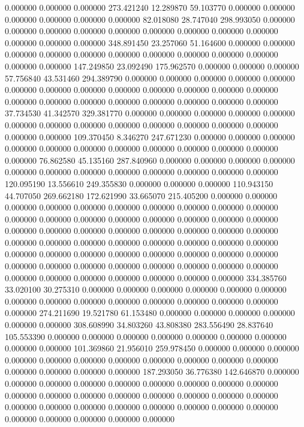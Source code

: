 0.000000 0.000000 0.000000
273.421240 12.289870 59.103770
0.000000 0.000000 0.000000
0.000000 0.000000 0.000000
82.018080 28.747040 298.993050
0.000000 0.000000 0.000000
0.000000 0.000000 0.000000
0.000000 0.000000 0.000000
0.000000 0.000000 0.000000
348.891450 23.257060 51.164600
0.000000 0.000000 0.000000
0.000000 0.000000 0.000000
0.000000 0.000000 0.000000
0.000000 0.000000 0.000000
147.249850 23.092490 175.962570
0.000000 0.000000 0.000000
57.756840 43.531460 294.389790
0.000000 0.000000 0.000000
0.000000 0.000000 0.000000
0.000000 0.000000 0.000000
0.000000 0.000000 0.000000
0.000000 0.000000 0.000000
0.000000 0.000000 0.000000
0.000000 0.000000 0.000000
37.734530 41.342570 329.381770
0.000000 0.000000 0.000000
0.000000 0.000000 0.000000
0.000000 0.000000 0.000000
0.000000 0.000000 0.000000
0.000000 0.000000 0.000000
109.370450 8.346270 247.671230
0.000000 0.000000 0.000000
0.000000 0.000000 0.000000
0.000000 0.000000 0.000000
0.000000 0.000000 0.000000
76.862580 45.135160 287.840960
0.000000 0.000000 0.000000
0.000000 0.000000 0.000000
0.000000 0.000000 0.000000
0.000000 0.000000 0.000000
120.095190 13.556610 249.355830
0.000000 0.000000 0.000000
110.943150 44.707050 269.662180
172.621990 33.665070 215.405200
0.000000 0.000000 0.000000
0.000000 0.000000 0.000000
0.000000 0.000000 0.000000
0.000000 0.000000 0.000000
0.000000 0.000000 0.000000
0.000000 0.000000 0.000000
0.000000 0.000000 0.000000
0.000000 0.000000 0.000000
0.000000 0.000000 0.000000
0.000000 0.000000 0.000000
0.000000 0.000000 0.000000
0.000000 0.000000 0.000000
0.000000 0.000000 0.000000
0.000000 0.000000 0.000000
0.000000 0.000000 0.000000
0.000000 0.000000 0.000000
0.000000 0.000000 0.000000
0.000000 0.000000 0.000000
0.000000 0.000000 0.000000
334.385760 33.020100 30.275310
0.000000 0.000000 0.000000
0.000000 0.000000 0.000000
0.000000 0.000000 0.000000
0.000000 0.000000 0.000000
0.000000 0.000000 0.000000
274.211690 19.521780 61.153480
0.000000 0.000000 0.000000
0.000000 0.000000 0.000000
308.608990 34.803260 43.808380
283.556490 28.837640 105.553390
0.000000 0.000000 0.000000
0.000000 0.000000 0.000000
0.000000 0.000000 0.000000
101.369860 21.956010 259.978450
0.000000 0.000000 0.000000
0.000000 0.000000 0.000000
0.000000 0.000000 0.000000
0.000000 0.000000 0.000000
0.000000 0.000000 0.000000
187.293050 36.776380 142.646870
0.000000 0.000000 0.000000
0.000000 0.000000 0.000000
0.000000 0.000000 0.000000
0.000000 0.000000 0.000000
0.000000 0.000000 0.000000
0.000000 0.000000 0.000000
0.000000 0.000000 0.000000
0.000000 0.000000 0.000000
0.000000 0.000000 0.000000
0.000000 0.000000 0.000000
